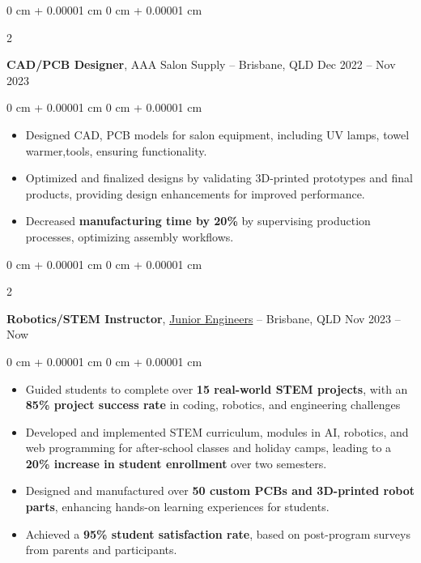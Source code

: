 \documentclass[10pt, letterpaper]{article}
\newenvironment{highlights}{
    \begin{itemize}[
        topsep=0.10 cm,
        parsep=0.10 cm,
        partopsep=0pt,
        itemsep=0pt,
        leftmargin=0 cm + 10pt
    ]
}{
    \end{itemize}
} %
\newenvironment{onecolentry}{
    \begin{adjustwidth}{
        0 cm + 0.00001 cm
    }{
        0 cm + 0.00001 cm
    }
}{
    \end{adjustwidth}
} %
\newenvironment{twocolentry}[2][]{
    \onecolentry
    \def\secondColumn{#2}
    \setcolumnwidth{\fill, 4.5 cm}
    \begin{paracol}{2}
}{
    \switchcolumn \raggedleft \secondColumn
    \end{paracol}
    \endonecolentry
} %
\begin{document}
\vspace{0.4 cm}

\begin{twocolentry}{
            Dec 2022 – Nov 2023
      }
      \textbf{CAD/PCB Designer}, AAA Salon Supply -- Brisbane, QLD\end{twocolentry}

\vspace{0.10 cm}
\begin{onecolentry}
      \begin{highlights}
            \item Designed CAD, PCB models for salon equipment, including UV lamps, towel warmer,tools, ensuring functionality.
            \item Optimized and finalized designs by validating 3D-printed prototypes and final products, providing design enhancements for
            improved performance.
            \item Decreased \textbf{manufacturing time by 20\%} 
            by supervising production processes, optimizing assembly workflows.
      \end{highlights}
\end{onecolentry}

\vspace{0.4 cm}

\begin{twocolentry}{
            Nov 2023 – Now
      }
      \textbf{Robotics/STEM Instructor}, \href{https://www.juniorengineers.com.au/}{Junior Engineers} -- Brisbane, QLD\end{twocolentry}

\vspace{0.10 cm}
\begin{onecolentry}
      \begin{highlights}
            \item Guided students to complete over \textbf{15 real-world STEM projects}, with an 
            \textbf{85\% project success rate} in coding, robotics, and engineering challenges
            \item Developed and implemented STEM curriculum, modules in AI, robotics, and web programming for after-school classes and holiday camps, leading to a \textbf{20\% increase in student enrollment} over two semesters.
            \item Designed and manufactured over \textbf{50 custom PCBs and 3D-printed robot parts}, enhancing hands-on learning experiences for students.
            \item Achieved a \textbf{95\% student satisfaction rate}, based on post-program surveys from parents and participants.
      \end{highlights}
\end{onecolentry}
\end{document}
